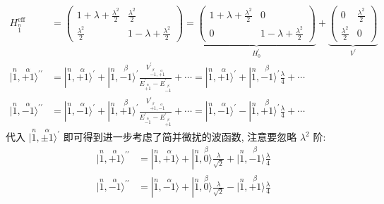     \begin{align*}
        H_{\stackrel{n}{1}}^{\text{eff}} &= \begin{pmatrix}
            1 + \lambda + \frac{\lambda^{2}}{2} & \frac{\lambda^{2}}{2}\\
            \frac{\lambda^{2}}{2} & 1 - \lambda + \frac{\lambda^{2}}{2}
        \end{pmatrix} = \underbrace{\begin{pmatrix}
            1 + \lambda + \frac{\lambda^{2}}{2}  & 0\\
            0 & 1 - \lambda + \frac{\lambda^{2}}{2}
        \end{pmatrix}}_{H_{0}^{\prime}} + \underbrace{\begin{pmatrix}
            0 & \frac{\lambda^{2}}{2}\\
            \frac{\lambda^{2}}{2} & 0
        \end{pmatrix}}_{V^{\prime}}\\
        |\stackrel{n}{1},\stackrel{\alpha}{+1}\rangle^{\prime\prime} &= |\stackrel{n}{1},\stackrel{\alpha}{+1}\rangle^{\prime} + |\stackrel{n}{1},\stackrel{\beta}{-1}\rangle^{\prime}\frac{V^{\prime}_{\stackrel{\beta}{-1},\stackrel{\alpha}{+1}}}{E^{\prime}_{\stackrel{\alpha}{+1}} - E^{\prime}_{\stackrel{\beta}{-1}}} + \cdots
        = |\stackrel{n}{1},\stackrel{\alpha}{+1}\rangle^{\prime} + |\stackrel{n}{1},\stackrel{\beta}{-1}\rangle^{\prime}\frac{\lambda}{4} + \cdots\\
        |\stackrel{n}{1},\stackrel{\alpha}{-1}\rangle^{\prime\prime} &= |\stackrel{n}{1},\stackrel{\alpha}{-1}\rangle^{\prime} + |\stackrel{n}{1},\stackrel{\beta}{+1}\rangle^{\prime}\frac{V^{\prime}_{\stackrel{\beta}{+1},\stackrel{\alpha}{-1}}}{E^{\prime}_{\stackrel{\alpha}{-1}} - E^{\prime}_{\stackrel{\beta}{+1}}} + \cdots
        = |\stackrel{n}{1},\stackrel{\alpha}{-1}\rangle^{\prime} - |\stackrel{n}{1},\stackrel{\beta}{+1}\rangle^{\prime}\frac{\lambda}{4} + \cdots
    \end{align*}
    代入 $|\stackrel{n}{1},\stackrel{\alpha}{\pm 1}\rangle^{\prime}$ 即可得到进一步考虑了简并微扰的波函数, 注意要忽略 $\lambda^{2}$ 阶:
    \begin{align*}
        |\stackrel{n}{1},\stackrel{\alpha}{+1}\rangle^{\prime\prime} &= |\stackrel{n}{1},\stackrel{\alpha}{+1}\rangle + |\stackrel{n}{1},\stackrel{\beta}{0}\rangle\frac{\lambda}{\sqrt{2}} + |\stackrel{n}{1},\stackrel{\beta}{-1}\rangle\frac{\lambda}{4}\\
        |\stackrel{n}{1},\stackrel{\alpha}{-1}\rangle^{\prime\prime} &= |\stackrel{n}{1},\stackrel{\alpha}{-1}\rangle + |\stackrel{n}{1},\stackrel{\beta}{0}\rangle\frac{\lambda}{\sqrt{2}} - |\stackrel{n}{1},\stackrel{\beta}{+1}\rangle\frac{\lambda}{4}
    \end{align*}
